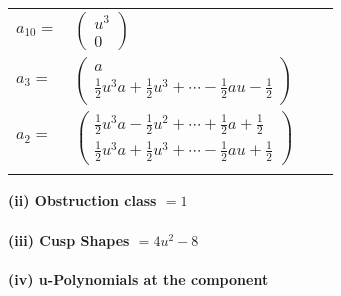 \documentclass[1p]{elsarticle_modified}
\theoremstyle{definition}
\begin{document}
\begin{tabular}{m{7pt} m{180pt} m{7pt} m{180pt} }
\flushright $a_{10}=$&$\begin{pmatrix}u^3\\0\end{pmatrix}$ \\
\flushright $a_{3}=$&$\begin{pmatrix}a\\\frac{1}{2} u^3 a+\frac{1}{2} u^3+\cdots-\frac{1}{2} a u-\frac{1}{2}\end{pmatrix}$ \\
\flushright $a_{2}=$&$\begin{pmatrix}\frac{1}{2} u^3 a-\frac{1}{2} u^2+\cdots+\frac{1}{2} a+\frac{1}{2}\\\frac{1}{2} u^3 a+\frac{1}{2} u^3+\cdots-\frac{1}{2} a u+\frac{1}{2}\end{pmatrix}$\\&\end{tabular}
\flushleft \textbf{(ii) Obstruction class $= 1$}\\~\\
\flushleft \textbf{(iii) Cusp Shapes $= 4 u^2-8$}\\~\\
\newpage\renewcommand{\arraystretch}{1}
\flushleft \textbf{(iv) u-Polynomials at the component}\newline \\
\end{document}
